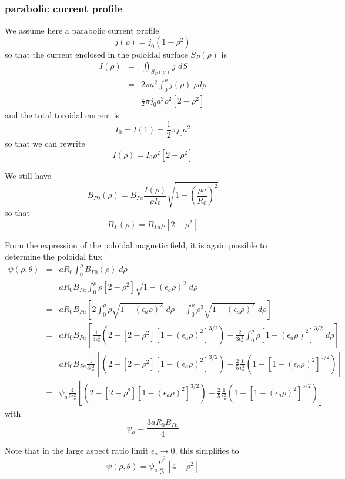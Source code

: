 \documentclass{article}
\begin{document}
\subsubsection{parabolic current profile}

We assume here a parabolic current profile 
\[
j\left( \rho \right) =j_{0}\left( 1-\rho ^{2}\right) 
\]
so that the current enclosed in the poloidal surface $S_{P}\left( \rho
\right) $ is 
\begin{eqnarray*}
I\left( \rho \right) &=&\iint_{S_{P}\left( \rho \right) }j\;dS \\
&=&2\pi a^{2}\int_{0}^{\rho }j\left( \rho \right) \;\rho d\rho \\
&=&\frac{1}{2}\pi j_{0}a^{2}\rho ^{2}\left[ 2-\rho ^{2}\right]
\end{eqnarray*}
and the total toroidal current is 
\[
I_{0}=I\left( 1\right) =\frac{1}{2}\pi j_{0}a^{2} 
\]
so that we can rewrite 
\[
I\left( \rho \right) =I_{0}\rho ^{2}\left[ 2-\rho ^{2}\right] 
\]

We still have 
\[
B_{P0}\left( \rho \right) =B_{Pa}\frac{I\left( \rho \right) }{\rho I_{0}}%
\sqrt{1-\left( \frac{\rho a}{R_{0}}\right) ^{2}} 
\]
so that 
\[
B_{P}\left( \rho \right) =B_{Pa}\rho \left[ 2-\rho ^{2}\right] 
\]

From the expression of the poloidal magnetic field, it is again possible to
determine the poloidal flux 
\begin{eqnarray*}
\psi \left( \rho ,\theta \right) &=&aR_{0}\int_{0}^{\rho }B_{P0}\left( \rho
\right) \;d\rho \\
&=&aR_{0}B_{Pa}\int_{0}^{\rho }\rho \left[ 2-\rho ^{2}\right] \sqrt{1-\left(
\epsilon _{a}\rho \right) ^{2}}\;d\rho \\
&=&aR_{0}B_{Pa}\left[ 2\int_{0}^{\rho }\rho \sqrt{1-\left( \epsilon _{a}\rho
\right) ^{2}}\;d\rho -\int_{0}^{\rho }\rho ^{3}\sqrt{1-\left( \epsilon
_{a}\rho \right) ^{2}}\;d\rho \right] \\
&=&aR_{0}B_{Pa}\left[ \frac{1}{3\epsilon _{a}^{2}}\left( 2-\left[ 2-\rho
^{2}\right] \left[ 1-\left( \epsilon _{a}\rho \right) ^{2}\right]
^{3/2}\right) -\frac{2}{3\epsilon _{a}^{2}}\int_{0}^{\rho }\rho \left[
1-\left( \epsilon _{a}\rho \right) ^{2}\right] ^{3/2}\;d\rho \right] \\
&=&aR_{0}B_{Pa}\frac{1}{3\epsilon _{a}^{2}}\left[ \left( 2-\left[ 2-\rho
^{2}\right] \left[ 1-\left( \epsilon _{a}\rho \right) ^{2}\right]
^{3/2}\right) -\frac{2}{5}\frac{1}{\epsilon _{a}^{2}}\left( 1-\left[
1-\left( \epsilon _{a}\rho \right) ^{2}\right] ^{5/2}\right) \right] \\
&=&\psi _{a}\frac{4}{9\epsilon _{a}^{2}}\left[ \left( 2-\left[ 2-\rho
^{2}\right] \left[ 1-\left( \epsilon _{a}\rho \right) ^{2}\right]
^{3/2}\right) -\frac{2}{5}\frac{1}{\epsilon _{a}^{2}}\left( 1-\left[
1-\left( \epsilon _{a}\rho \right) ^{2}\right] ^{5/2}\right) \right]
\end{eqnarray*}
with 
\[
\psi _{a}=\frac{3aR_{0}B_{Pa}}{4} 
\]

Note that in the large aspect ratio limit $\epsilon _{a}\rightarrow 0$, this
simplifies to 
\begin{equation}
\psi \left( \rho ,\theta \right) =\psi _{a}\frac{\rho ^{2}}{3}\left[ 4-\rho
^{2}\right]
\end{equation}
\end{document}
